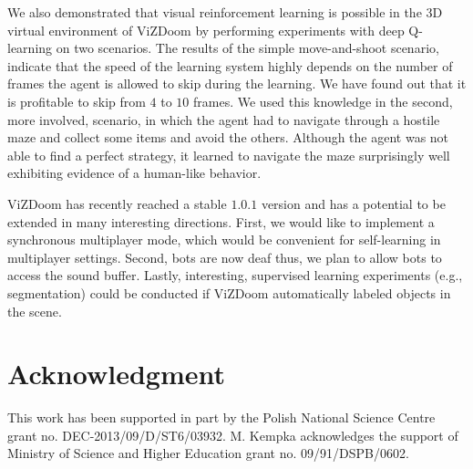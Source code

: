 \documentclass[english,american,conference, balance]{IEEEtran}
\begin{document}
We also demonstrated that visual reinforcement learning is possible
in the 3D virtual environment of ViZDoom by performing experiments
with deep Q-learning on two scenarios. The results of the simple move-and-shoot
scenario, indicate that the speed of the learning system highly depends
on the number of frames the agent is allowed to skip during the learning.
We have found out that it is profitable to skip from $4$ to $10$
frames. We used this knowledge in the second, more involved, scenario,
in which the agent had to navigate through a hostile maze and collect
some items and avoid the others. Although the agent was not able to
find a perfect strategy, it learned to navigate the maze surprisingly
well exhibiting evidence of a human-like behavior.

ViZDoom has recently reached a stable $1.0.1$ version and has a potential
to be extended in many interesting directions. First, we would like
to implement a synchronous multiplayer mode, which would be convenient
for self-learning in multiplayer settings. Second, bots are now deaf
thus, we plan to allow bots to access the sound buffer. Lastly, interesting,
supervised learning experiments (e.g., segmentation) could be conducted
if ViZDoom automatically labeled objects in the scene.

\section*{Acknowledgment }

This work has been supported in part by the Polish National Science
Centre grant no. DEC-2013/09/D/ST6/03932. M. Kempka acknowledges the
support of Ministry of Science and Higher Education grant no. 09/91/DSPB/0602.



\end{document}
